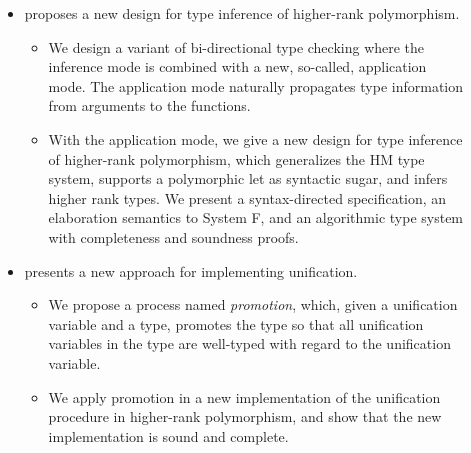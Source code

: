 \begin{description}
\item[]
  \begin{itemize}
  \item {} proposes a new design for type inference of
    higher-rank polymorphism.
    \begin{itemize}
    \item We design a variant of bi-directional type checking
      where the inference mode is combined with a new, so-called, application
      mode. The application mode naturally propagates type information from
      arguments to the functions.
    \item With the application mode, we give a new design for type inference of
      higher-rank polymorphism, which generalizes the HM type system, supports a
      polymorphic let as syntactic sugar, and infers higher rank types. We
      present a syntax-directed specification, an elaboration semantics to
      System F, and an algorithmic type system with completeness and soundness
      proofs.
    \end{itemize}

  \item {} presents a new approach for implementing unification.
    \begin{itemize}
    \item We propose a process named \textit{promotion}, which, given a
      unification variable and a type, promotes the type so
      that all unification variables in the type are well-typed with regard to
      the unification variable.
    \item We apply promotion in a new implementation of the unification
      procedure in higher-rank polymorphism, and show that the new
      implementation is sound and complete.
    \end{itemize}
  \end{itemize}

\item[]
  \begin{itemize}


\end{itemize}
\end{description}

